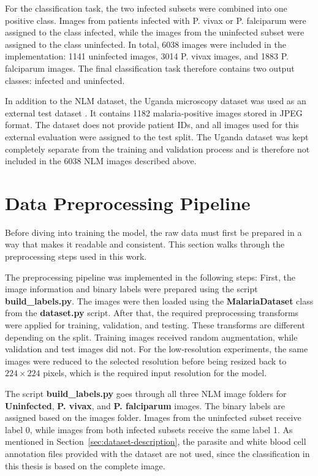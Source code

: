 For the classification task, the two infected subsets were combined into one positive class. Images from patients infected with P. vivax or P. falciparum were assigned to the class infected, while the images from the uninfected subset were assigned to the class uninfected. In total, 6038 images were included in the implementation: 1141 uninfected images, 3014 P. vivax images, and 1883 P. falciparum images. The final classification task therefore contains two output classes: infected and uninfected.

In addition to the NLM dataset, the Uganda microscopy dataset was used as an external test dataset \cite{Quinn2016}. It contains 1182 malaria-positive images stored in JPEG format. The dataset does not provide patient IDs, and all images used for this external evaluation were assigned to the test split. The Uganda dataset was kept completely separate from the training and validation process and is therefore not included in the 6038 NLM images described above.

\section{Data Preprocessing Pipeline}
\label{sec:data-preprocessing}

Before diving into training the model, the raw data must first be prepared in a way that makes it readable and consistent. This section walks through the preprocessing steps used in this work.

The preprocessing pipeline was implemented in the following steps: First, the image information and binary labels were prepared using the script \textbf{build\_labels.py}. The images were then loaded using the \textbf{MalariaDataset} class from the \textbf{dataset.py} script. After that, the required preprocessing transforms were applied for training, validation, and testing. These transforms are different depending on the split. Training images received random augmentation, while validation and test images did not. For the low-resolution experiments, the same images were reduced to the selected resolution before being resized back to \(224 \times 224\) pixels, which is the required input resolution for the model.

The script \textbf{build\_labels.py} goes through all three NLM image folders for \textbf{Uninfected}, \textbf{P. vivax}, and \textbf{P. falciparum} images. The binary labels are assigned based on the images folder. Images from the uninfected subset receive label 0, while images from both infected subsets receive the same label 1. As mentioned in Section~\ref{sec:dataset-description}, the parasite and white blood cell annotation files provided with the dataset are not used, since the classification in this thesis is based on the complete image.

